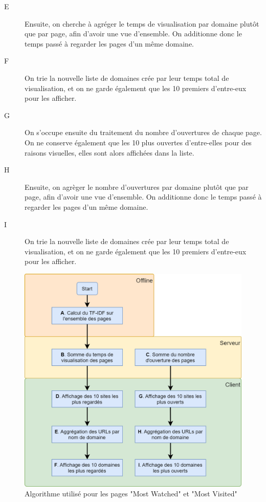 \begin{description}
			\item[E] Ensuite, on cherche à agréger le temps de visualisation par domaine plutôt que par page, afin d'avoir une vue d'ensemble. On additionne donc le temps passé à regarder les pages d'un même domaine.

			\item[F] On trie la nouvelle liste de domaines crée par leur temps total de visualisation, et on ne garde également que les 10 premiers d'entre-eux pour les afficher.

			\item[G] On s'occupe ensuite du traitement du nombre d'ouvertures de chaque page. On ne conserve également que les 10 plus ouvertes d'entre-elles pour des raisons visuelles, elles sont alors affichées dans la liste.

			\item[H] Ensuite, on agrèger le nombre d'ouvertures par domaine plutôt que par page, afin d'avoir une vue d'ensemble. On additionne donc le temps passé à regarder les pages d'un même domaine.

			\item[I] On trie la nouvelle liste de domaines crée par leur temps total de visualisation, et on ne garde également que les 10 premiers d'entre-eux pour les afficher.
		\end{description}

		\begin{figure}[!h]
			\centering
			\includegraphics[height=0.8\textwidth]{images/design/pages/mostwatched_algo}
			\caption{Algorithme utilisé pour les pages "Most Watched" et "Most Visited"}
			\label{mostwatched_algo}
		\end{figure}

